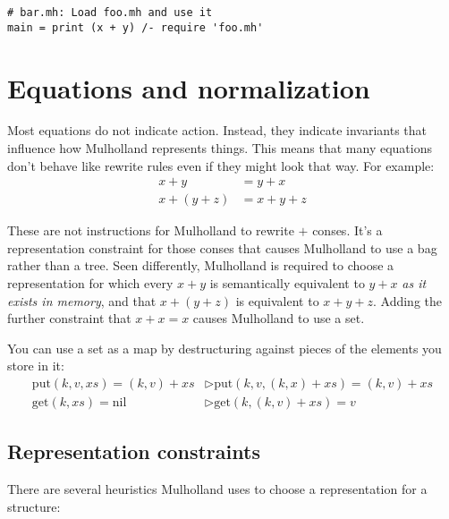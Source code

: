 \documentclass{report}
\begin{document}
\begin{verbatim}
# bar.mh: Load foo.mh and use it
main = print (x + y) /- require 'foo.mh'
\end{verbatim}

\chapter{Equations and normalization}
  Most equations do not indicate action. Instead, they indicate invariants that influence how Mulholland represents things. This means that many equations don't behave like rewrite rules even
  if they might look that way. For example:
\begin{align*}
x + y       & = y + x \\
x + (y + z) & = x + y + z
\end{align*}

  These are not instructions for Mulholland to rewrite $+$ conses. It's a representation constraint for those conses that causes Mulholland to use a bag rather than a tree. Seen differently,
  Mulholland is required to choose a representation for which every $x + y$ is semantically equivalent to $y + x$ {\em as it exists in memory}, and that $x + (y + z)$ is equivalent to $x + y +
  z$. Adding the further constraint that $x + x = x$ causes Mulholland to use a set.

  You can use a set as a map by destructuring against pieces of the elements you store in it:
\begin{align*}
\textrm{put}(k, v, xs) = (k, v) + xs  & \rhd \textrm{put}(k, v, (k, x) + xs) = (k, v) + xs \\
\textrm{get}(k, xs)    = \textrm{nil} & \rhd \textrm{get}(k, (k, v) + xs)    = v
\end{align*}

\section{Representation constraints}
    There are several heuristics Mulholland uses to choose a representation for a structure:
\end{document}
